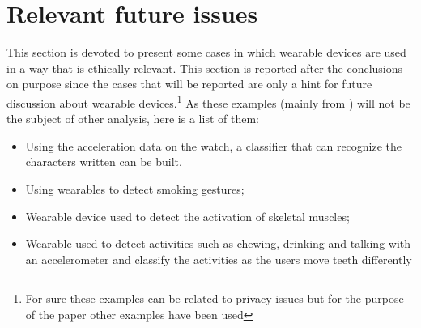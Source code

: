 \documentclass{article}
\begin{document}
\section{Relevant future issues}
This section is devoted to present some cases in which wearable devices are used in a way that is ethically relevant. This section is reported after the conclusions on purpose since the cases that will be reported are only a hint for future discussion about wearable devices.\footnote{For sure these examples can be related to privacy issues but for the purpose of the paper other examples have been used} As these examples (mainly from \cite{seneviratne_survey_2017}) will not be the subject of other analysis, here is a list of them:
\begin{itemize}
    \item Using the acceleration data on the watch, a classifier that can recognize the characters written can be built.
    \item Using wearables to detect smoking gestures;
    \item Wearable device used to detect the activation of skeletal muscles;
    \item Wearable used to detect activities such as chewing, drinking and talking with an accelerometer and classify the activities as the users move teeth differently
    
\end{itemize}







\newpage


\end{document}
